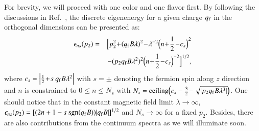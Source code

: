 \documentclass[aps,prd,amsmath,two column,amssymb,showpacs]{revtex4}
\begin{document}
For brevity, we will proceed with one color and one flavor first. By following the discussions in Ref.~\cite{Cangemi:1995ee,Dunne:1997kw}, the discrete eigenenergy for a given charge $q_{\rm f}$ in the orthogonal dimensions can be presented as:
\begin{eqnarray}
\epsilon_{ns}(p_2)&=&\Big[p_2^2\!+\!(q_{\rm f}B\lambda)^2\!-\!\lambda^{-2}\Big(n\!+\!{1\over2}\!-\!c_s\Big)^2\nonumber\\
&&\!-(p_2q_{\rm f}B\lambda^2)^2\Big(n\!+\!{1\over2}\!-\!c_s\Big)^{-2}\Big]^{1/2},
\end{eqnarray}
where $c_s=\Big|{1\over2}\!+\!s~q_{\rm f}B\lambda^2\Big|$ with $s=\pm$ denoting the fermion spin along $z$ direction and $n$ is constrained to $0\le n\le N_s$ with $N_s={\rm ceiling}\Big(c_s-{3\over2}\!-\!\sqrt{|p_2q_{\rm f}B\lambda^3|}\Big)$. One should notice that in the constant magnetic field limit $\lambda\rightarrow\infty$, $\epsilon_{ns}(p_2)=[(2n+1-s~{\rm sgn}(q_{\rm f}B))|q_{\rm f}B|]^{1/2}$ and $N_s\rightarrow\infty$ for a fixed $p_2$. Besides, there are also contributions from the continuum spectra as we will illuminate soon. 
\end{document}
